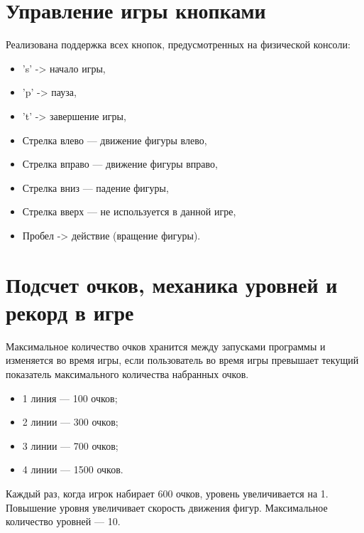 \documentclass{article}
\begin{document}
\section{Управление игры кнопками}
Реализована поддержка всех кнопок, предусмотренных на физической консоли:
\begin{itemize}
    \item 's' -> начало игры,
    \item 'p' -> пауза,
    \item 't' -> завершение игры,
    \item Стрелка влево — движение фигуры влево,
    \item Стрелка вправо — движение фигуры вправо,
    \item Стрелка вниз — падение фигуры,
    \item Стрелка вверх — не используется в данной игре,
    \item Пробел -> действие (вращение фигуры).
\end{itemize}

\section{Подсчет очков, механика уровней и рекорд в игре}
Максимальное количество очков хранится между запусками программы и изменяется
\newline во время игры, если пользователь во время игры превышает текущий 
\newline показатель максимального количества набранных очков.
\begin{itemize}
    \item 1 линия — 100 очков;
    \item 2 линии — 300 очков;
    \item 3 линии — 700 очков;
    \item 4 линии — 1500 очков.
\end{itemize}

Каждый раз, когда игрок набирает 600 очков, уровень увеличивается на 1. 
\newline Повышение уровня увеличивает скорость движения фигур. 
\newline Максимальное количество уровней — 10.
\end{document}
